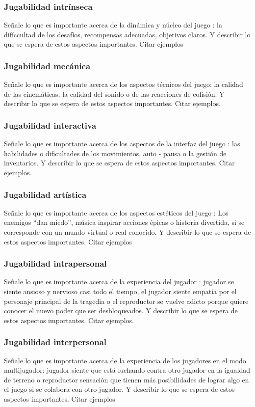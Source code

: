 \subsubsection{Jugabilidad intrínseca}
Señale lo que es importante acerca de la dinámica y núcleo del juego : la difíccultad de los desafíos, recompensas adecuadas, objetivos claros. Y describir lo que se espera de estos aspectos importantes. Citar ejemplos

\subsubsection{Jugabilidad mecánica}
Señale lo que es importante acerca de los aspectos técnicos del juego: la calidad de las cinemáticas, la calidad del sonido o de las reacciones de colisión. Y describir lo que se espera de estos aspectos importantes. Citar ejemplos.

\subsubsection{Jugabilidad interactiva}
Señale lo que es importante acerca de los aspectos de la interfaz del juego : las habilidades o dificultades de los movimientos, auto - pausa o la gestión de inventarios. Y describir lo que se espera de estos aspectos importantes. Citar ejemplos.

\subsubsection{Jugabilidad artística}
Señale lo que es importante acerca de los aspectos estéticos del juego : Los enemigos “dan miedo”, música inspirar acciones épicas o historia divertida, si se corresponde con un mundo virtual o real conocido. Y describir lo que se espera de estos aspectos importantes. Citar ejemplos

\subsubsection{Jugabilidad intrapersonal}
Señale lo que es importante acerca de la experiencia del jugador : jugador se siente ansioso y nervioso casi todo el tiempo, el jugador siente empatía por el personaje principal de la tragedia o el reproductor se vuelve adicto porque quiere conocer el nuevo poder que ser desbloqueados. Y describir lo que se espera de estos aspectos importantes. Citar ejemplos.

\subsubsection{Jugabilidad interpersonal}
Señale lo que es importante acerca de la experiencia de los jugadores en el modo multijugador: jugador siente que está luchando contra otro jugador en la igualdad de terreno o reproductor sensación que tienen más posibilidades de lograr algo en el juego si se colabora con otro jugador. Y describir lo que se espera de estos aspectos importantes. Citar ejemplos

